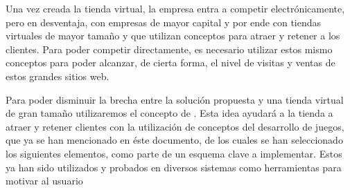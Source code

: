 Una vez creada la tienda virtual, la empresa entra a competir electrónicamente,
pero en desventaja, con empresas de mayor capital y por ende con tiendas virtuales
de mayor tamaño y que utilizan conceptos para atraer y retener a los clientes.
Para poder competir directamente, es necesario utilizar estos mismo conceptos para
poder alcanzar, de cierta forma, el nivel de visitas y ventas de estos grandes
sitios web.

Para poder disminuir la brecha entre la solución propuesta y una tienda virtual
de gran tamaño utilizaremos el concepto de {\GAM}.
Esta idea ayudará a la tienda a atraer y retener clientes con la utilización
de conceptos del desarrollo de juegos, que ya se han mencionado en éste documento,
de los cuales se han seleccionado los siguientes elementos, como parte
de un esquema clave a implementar. Estos ya han sido utilizados y probados en diversos
sistemas como herramientas para motivar al usuario\cite{SocialMotivation}

